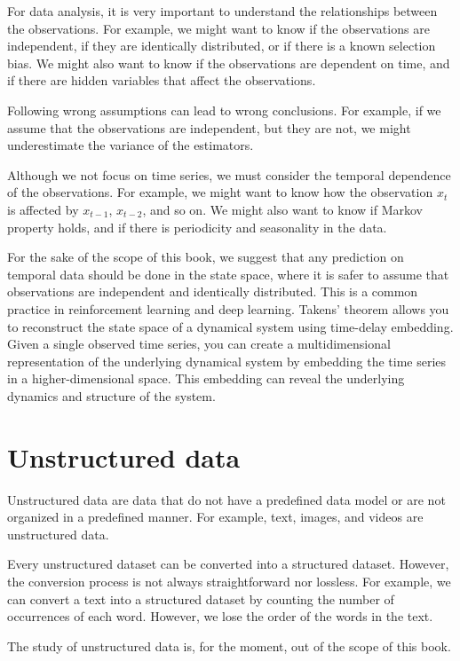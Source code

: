 For data analysis, it is very important to understand the relationships between the
observations.  For example, we might want to know if the observations are independent, if
they are identically distributed, or if there is a known selection bias.  We might also
want to know if the observations are dependent on time, and if there are hidden variables
that affect the observations.

Following wrong assumptions can lead to wrong conclusions.  For example, if we assume that
the observations are independent, but they are not, we might underestimate the variance of
the estimators.

Although we not focus on time series, we must consider the temporal dependence of the
observations.  For example, we might want to know how the observation $x_t$ is affected by
$x_{t-1}$, $x_{t-2}$, and so on.  We might also want to know if Markov property holds,
and if there is periodicity and seasonality in the data.

For the sake of the scope of this book, we suggest that any prediction on temporal data
should be done in the state space, where it is safer to assume that observations are
independent and identically distributed.  This is a common practice in reinforcement
learning and deep learning. Takens' theorem allows you to
reconstruct the state space of a dynamical system using time-delay embedding. Given a
single observed time series, you can create a multidimensional representation of the
underlying dynamical system by embedding the time series in a higher-dimensional space.
This embedding can reveal the underlying dynamics and structure of the system.

\section{Unstructured data}

Unstructured data are data that do not have a predefined data model or are not organized
in a predefined manner.  For example, text, images, and videos are unstructured data.

Every unstructured dataset can be converted into a structured dataset.  However, the
conversion process is not always straightforward nor lossless.  For example, we can
convert a text into a structured dataset by counting the number of occurrences of each
word.  However, we lose the order of the words in the text.

The study of unstructured data is, for the moment, out of the scope of this book.
